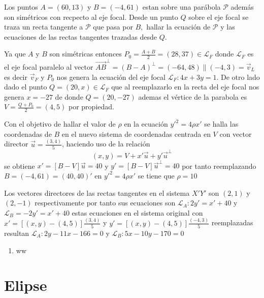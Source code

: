\documentclass[10pt,]{krantz}
\providecommand{\tightlist}{%
  \setlength{\itemsep}{0pt}\setlength{\parskip}{0pt}}
\theoremstyle{definition}
\theoremstyle{definition}
\theoremstyle{definition}
\theoremstyle{remark}
\let\BeginKnitrBlock\begin \let\EndKnitrBlock\end
\begin{document}
\BeginKnitrBlock{exercise}
\protect\hypertarget{exr:unnamed-chunk-6}{}{\label{exr:unnamed-chunk-6} }Los puntos \(A=(60,13)\) y \(B=(-4,61)\) estan sobre una parábola \(\mathcal{P}\) además son simétricos con recpecto al eje focal. Desde un punto \(Q\) sobre el eje focal se traza un recta tangente a \(\mathcal{P}\) que pasa por \(B,\) hallar la ecuación de \(\mathcal{P}\) y las ecuaciones de las rectas tangentes trazadas desde \(Q\).
\EndKnitrBlock{exercise}

\BeginKnitrBlock{solution}
{}Ya que \(A\) y \(B\) son simétricas entonces \(P_0=\frac{A+B}{2}=(28,37) \in \mathcal{L}_F\) donde \(\mathcal{L}_F\) es el eje focal paralelo al vector \(\vec{AB}^\perp=(B-A)^\perp=(-64,48)\parallel(-4,3)=\vec{v}_L\) es decir \(\vec{v}_F\) y \(P_0\) nos genera la ecuación del eje focal \(\mathcal{L}_F:4x+3y=1\). De otro lado dado el punto \(Q=(20,x)\in\mathcal{L}_F\) que al reemplazarlo en la recta del eje focal nos genera \(x=-27\) de donde \(Q=(20,-27)\) ademas el vértice de la parabola es \(V=\frac{Q+P_0}{2}=(4,5)\) por propiedad.

Con el objetivo de hallar el valor de \(\rho\) en la ecuación \(y'^2=4\rho x'\) se halla las coordenadas de \(B\) en el nuevo sistema de coordenadas centrada en \(V\) con vector director \(\vec{u}=\frac{(3,4)}{5}\), haciendo uso de la relación \[(x,y)=V+x'\vec{u}+y'\vec{u}^\perp\] se obtiene \(x'=\left[B-V\right]\vec{u}=40\) y \(y'=\left[B-V\right]\vec{u}^\perp=40\) por tanto reemplazando \(B=(-4,61)=(40,40)'\) en \(y'^2=4\rho x'\) se tiene que \(\rho=10\)

Los vectores directores de las rectas tangentes en el sistema \(X'Y'\) son \((2,1)\) y \((2,-1)\) respectivamente por tanto sus ecuaciones son \(\mathcal{L}_A: 2y'=x'+40\) y \(\mathcal{L}_B=-2y'=x'+40\) estas ecuaciones en el sistema original con \(x'=\left[(x,y)-(4,5)\right]\frac{(3,4)}{5}\) y \(y'=\left[(x,y)-(4,5)\right]\frac{(-4,3)}{5}\) reemplazadas resultan \(\mathcal{L}_A:2y-11x-166=0\) y \(\mathcal{L}_B:5x-10y-170=0\)
\EndKnitrBlock{solution}

\begin{enumerate}
\def\labelenumi{\arabic{enumi}.}
\tightlist
\item
  ww
\end{enumerate}

\hypertarget{elipse}{%
\chapter{Elipse}\label{elipse}}
\end{document}
